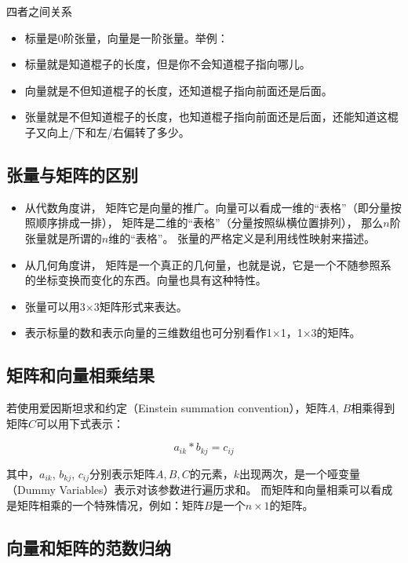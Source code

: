 四者之间关系

\begin{itemize}\itemsep0em
		\item 标量是0阶张量，向量是一阶张量。举例：  
		\item 标量就是知道棍子的长度，但是你不会知道棍子指向哪儿。  
		\item 向量就是不但知道棍子的长度，还知道棍子指向前面还是后面。  
		\item 张量就是不但知道棍子的长度，也知道棍子指向前面还是后面，还能知道这棍子又向上/下和左/右偏转了多少。
\end{itemize}

\subsection{张量与矩阵的区别}

\begin{itemize}\itemsep0em
		\item 从代数角度讲， 矩阵它是向量的推广。向量可以看成一维的“表格”（即分量按照顺序排成一排）， 矩阵是二维的“表格”（分量按照纵横位置排列）， 那么$n$阶张量就是所谓的$n$维的“表格”。 张量的严格定义是利用线性映射来描述。
		\item 从几何角度讲， 矩阵是一个真正的几何量，也就是说，它是一个不随参照系的坐标变换而变化的东西。向量也具有这种特性。
		\item 张量可以用3×3矩阵形式来表达。 
		\item 表示标量的数和表示向量的三维数组也可分别看作1×1，1×3的矩阵。 
\end{itemize}

\subsection{矩阵和向量相乘结果}

若使用爱因斯坦求和约定（Einstein summation convention），矩阵$A$, $B$相乘得到矩阵$C$可以用下式表示：

\begin{equation} \label{eq:1.3-1}
	a_{ik}*b_{kj}=c_{ij}
\end{equation}

其中，$a_{ik}$, $b_{kj}$, $c_{ij}$分别表示矩阵$A, B, C$的元素，$k$出现两次，是一个哑变量（Dummy Variables）表示对该参数进行遍历求和。
而矩阵和向量相乘可以看成是矩阵相乘的一个特殊情况，例如：矩阵$B$是一个$n \times 1$的矩阵。

\subsection{向量和矩阵的范数归纳}  

